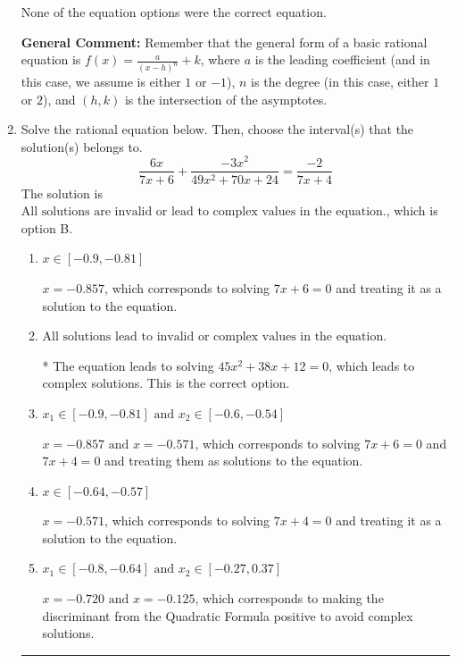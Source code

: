 \documentclass{extbook}[14pt]
\newcommand{\litem}[1]{\item #1

\rule{\textwidth}{0.4pt}}
\begin{document}
\begin{enumerate}
{\begin{enumerate}[label=\Alph*.]
None of the equation options were the correct equation.
\end{enumerate}

\textbf{General Comment:} Remember that the general form of a basic rational equation is $ f(x) = \frac{a}{(x-h)^n} + k$, where $a$ is the leading coefficient (and in this case, we assume is either $1$ or $-1$), $n$ is the degree (in this case, either $1$ or $2$), and $(h, k)$ is the intersection of the asymptotes.
}
\litem{
Solve the rational equation below. Then, choose the interval(s) that the solution(s) belongs to.
\[ \frac{6x}{7x + 6} + \frac{-3x^{2}}{49x^{2} +70 x + 24} = \frac{-2}{7x + 4} \]The solution is \( \text{All solutions are invalid or lead to complex values in the equation.} \), which is option B.\begin{enumerate}[label=\Alph*.]
\item \( x \in [-0.9,-0.81] \)

$x = -0.857$, which corresponds to solving $7x + 6 = 0$ and treating it as a solution to the equation.
\item \( \text{All solutions lead to invalid or complex values in the equation.} \)

* The equation leads to solving $45x^{2} +38 x + 12=0$, which leads to complex solutions. This is the correct option.
\item \( x_1 \in [-0.9, -0.81] \text{ and } x_2 \in [-0.6,-0.54] \)

$x = -0.857 \text{ and } x = -0.571$, which corresponds to solving $7x + 6 = 0$ and $7x + 4 = 0$ and treating them as solutions to the equation.
\item \( x \in [-0.64,-0.57] \)

$x = -0.571$, which corresponds to solving $7x + 4 = 0$ and treating it as a solution to the equation.
\item \( x_1 \in [-0.8, -0.64] \text{ and } x_2 \in [-0.27,0.37] \)

$x = -0.720 \text{ and } x = -0.125$, which corresponds to making the discriminant from the Quadratic Formula positive to avoid complex solutions.
\end{enumerate}

}
\end{enumerate}
\end{document}
